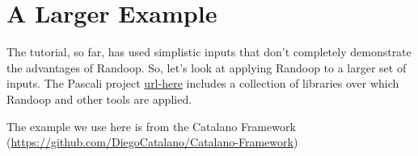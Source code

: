 \documentclass[11pt, oneside]{article} %
\begin{document}
\section{A Larger Example}\label{largerexample}
The tutorial, so far, has used simplistic inputs that don't completely demonstrate the advantages of Randoop. 
So, let's look at applying Randoop to a larger set of inputs.
The Pascali project \url{url-here} includes a collection of libraries over which Randoop and other tools are applied. 

The example we use here is from the Catalano Framework (\url{https://github.com/DiegoCatalano/Catalano-Framework})
\end{document}

